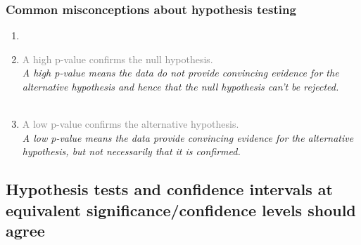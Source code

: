 \documentclass[slidestop,compress,mathserif,12pt,t,professionalfonts,xcolor=table]{beamer}
\begin{document}
\begin{frame}
\frametitle{Common misconceptions about hypothesis testing}

\begin{enumerate}

\item 

\item  \textcolor{gray}{A high p-value confirms the null hypothesis.}\\
\textit{A high p-value means the data do not provide convincing evidence for the alternative 
hypothesis and hence that the null hypothesis can't be rejected.} \\
$\:$ \\
\item   \textcolor{gray}{A low p-value confirms the alternative hypothesis.} \\
\textit{A low p-value means the data provide convincing evidence for the alternative hypothesis, 
but not necessarily that it is confirmed.} \\

\end{enumerate}

\end{frame}



\subsection{Hypothesis tests and confidence intervals at equivalent significance/confidence levels should agree}
\label{mi2}

\end{document}
